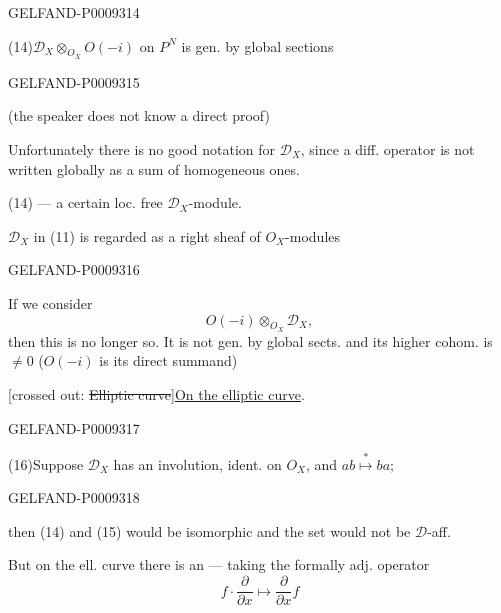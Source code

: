 \begin{GelfandAdjacentEvidence}{GELFAND-P000931}{4}


\hspace{2em}{\small e.g.,}

(14)\quad $\mathcal D_X\otimes_{O_X}O(-i)$ on $P^N$ is gen. by global sections
\end{GelfandAdjacentEvidence}
\begin{GelfandAdjacentEvidence}{GELFAND-P000931}{5}


(the speaker does not know a direct proof)

Unfortunately there is no good notation for $\mathcal D_X$, since a diff. operator is not written globally as a sum of homogeneous ones.

(14) --- a certain loc. free $\mathcal D_X$-module.

$\mathcal D_X$ in (11) is regarded as a right sheaf of $O_X$-modules
\end{GelfandAdjacentEvidence}
\begin{GelfandAdjacentEvidence}{GELFAND-P000931}{6}


If we consider
\begin{equation*}
 O(-i)\otimes_{O_X}\mathcal D_X,
 \tag{15}
\end{equation*}
then this is no longer so. It is not gen. by global sects. and its higher cohom. is $\ne0$ ($O(-i)$ is its direct summand)

[crossed out: \sout{Elliptic curve}]\qquad\underline{On the elliptic curve}.
\end{GelfandAdjacentEvidence}
\begin{GelfandAdjacentEvidence}{GELFAND-P000931}{7}


(16)\quad Suppose $\mathcal D_X$ has an involution, ident. on $O_X$, and \(ab\overset{*}{\mapsto}ba\);
\end{GelfandAdjacentEvidence}
\begin{GelfandAdjacentEvidence}{GELFAND-P000931}{8}


then (14) and (15) would be isomorphic and the set would not be $\mathcal D$-aff.

But on the ell. curve there is an  --- taking the formally adj. operator
\[
 f\cdot\frac{\partial}{\partial x}\mapsto\frac{\partial}{\partial x}f
\]
\end{GelfandAdjacentEvidence}
